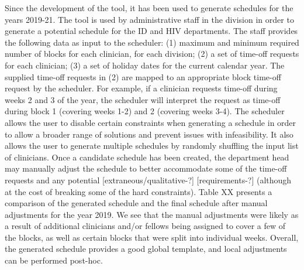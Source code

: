 Since the development of the tool, it has been used to generate schedules for the years 2019-21.
The tool is used by administrative staff in the division in order to generate a potential schedule
for the ID and HIV departments. 
The staff provides the following data as input to the scheduler:
(1) maximum and minimum required number of blocks for each clinician, for each division;
(2) a set of time-off requests for each clinician;
(3) a set of holiday dates for the current calendar year.
The supplied time-off requests in (2) are mapped to an appropriate block time-off request by the scheduler.
For example, if a clinician requests time-off during weeks 2 and 3 of the year, the scheduler
will interpret the request as time-off during block 1 (covering weeks 1-2) and 2 (covering weeks 3-4).
The scheduler allows the user to disable certain constraints when generating a schedule
in order to allow a broader range of solutions and prevent issues with infeasibility. 
It also allows the user to generate multiple schedules by randomly shuffling the input list of clinicians.
Once a candidate schedule has been created, the department head may manually
adjust the schedule to better accommodate some of the time-off requests
and any potential [extraneous/qualitative-?] [requirements-?]
(although at the cost of breaking some of the hard constraints).
Table XX presents a comparison of the generated schedule and the final schedule after manual adjustments
for the year 2019. We see that the manual adjustments were likely as a result of additional clinicians
and/or fellows being assigned to cover a few of the blocks, as well as certain blocks that were 
split into individual weeks. Overall, the generated schedule provides a good global template,
and local adjustments can be performed post-hoc.

